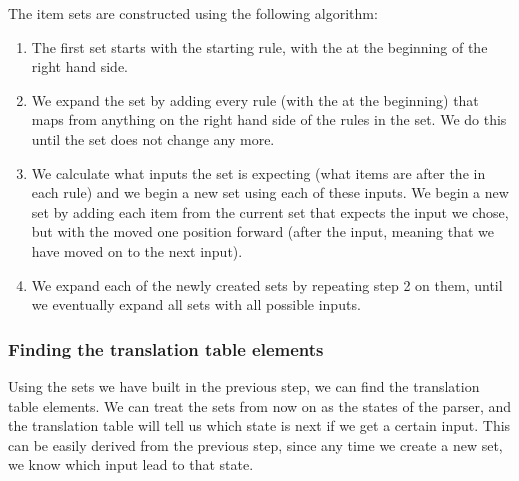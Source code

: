 The item sets are constructed using the following algorithm:
\begin{enumerate}
\item The first set starts with the starting rule, with the \textbullet at the beginning of the right hand side.
\item We expand the set by adding every rule (with the \textbullet at the beginning) that maps from anything on the right hand side of the rules in the set. We do this until the set does not change any more.
\item We calculate what inputs the set is expecting (what items are after the \textbullet in each rule) and we begin a new set using each of these inputs. We begin a new set by adding each item from the current set that expects the input we chose, but with the \textbullet moved one position forward (after the input, meaning that we have moved on to the next input).
\item We expand each of the newly created sets by repeating step 2 on them, until we eventually expand all sets with all possible inputs.
\end{enumerate}
\subsubsection{Finding the translation table elements} 
Using the sets we have built in the previous step, we can find the translation table elements. We can treat the sets from now on as the states of the parser, and the translation table will tell us which state is next if we get a certain input. This can be easily derived from the previous step, since any time we create a new set, we know which input lead to that state.

